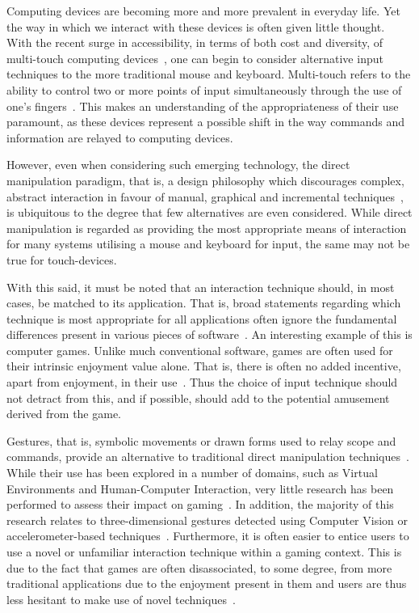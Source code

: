 \graphicspath{{./intro/}}
\setcounter{page}{1}

Computing devices are becoming more and more prevalent in everyday life. Yet the way in which we interact with these devices is often given little thought. With the recent surge in accessibility, in terms of both cost and diversity, of multi-touch computing devices~\citep{Mosc07}, one can begin to consider alternative input techniques to the more traditional mouse and keyboard. Multi-touch refers to the ability to control two or more points of input simultaneously through the use of one's fingers~\citep{Jaim07}. This makes an understanding of the appropriateness of their use paramount, as these devices represent a possible shift in the way commands and information are relayed to computing devices.

However, even when considering such emerging technology, the direct manipulation paradigm, that is, a design philosophy which discourages complex, abstract interaction in favour of manual, graphical and incremental techniques~\citep{Shne82}, is ubiquitous to the degree that few alternatives are even considered. While direct manipulation is regarded as providing the most appropriate means of interaction for many systems utilising a mouse and keyboard for input, the same may not be true for touch-devices. 

With this said, it must be noted that an interaction technique should, in most cases, be matched to its application. That is, broad statements regarding which technique is most appropriate for all applications often ignore the fundamental differences present in various pieces of software~\citep{Froh93}. An interesting example of this is computer games. Unlike much conventional software, games are often used for their intrinsic enjoyment value alone. That is, there is often no added incentive, apart from enjoyment, in their use~\citep{Swee05}. Thus the choice of input technique should not detract from this, and if possible, should add to the potential amusement derived from the game.

Gestures, that is, symbolic movements or drawn forms used to relay scope and commands, provide an alternative to traditional direct manipulation techniques~\citep{Rubi91}. While their use has been explored in a number of domains, such as Virtual Environments and Human-Computer Interaction, very little research has been performed to assess their impact on gaming~\citep{Krat07}. In addition, the majority of this research relates to three-dimensional gestures detected using Computer Vision or accelerometer-based techniques~\citep{Kang04}. Furthermore, it is often easier to entice users to use a novel or unfamiliar interaction technique within a gaming context. This is due to the fact that games are often disassociated, to some degree, from more traditional applications due to the enjoyment present in them and users are thus less hesitant to make use of novel techniques~\citep{Star00}. 

